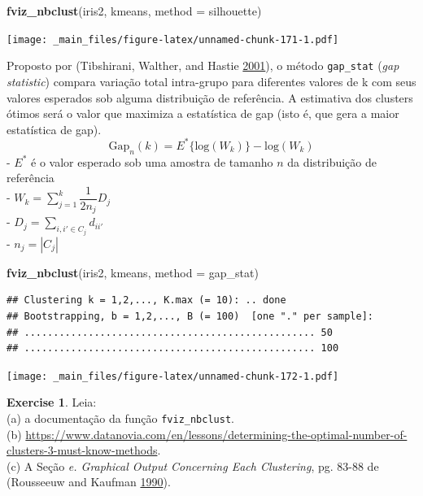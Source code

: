 \documentclass[
]{book}
\newenvironment{Shaded}{\begin{snugshade}}{\end{snugshade}}
\newcommand{\DataTypeTok}[1]{\textcolor[rgb]{0.13,0.29,0.53}{#1}}
\newcommand{\KeywordTok}[1]{\textcolor[rgb]{0.13,0.29,0.53}{\textbf{#1}}}
\newcommand{\NormalTok}[1]{#1}
\newcommand{\StringTok}[1]{\textcolor[rgb]{0.31,0.60,0.02}{#1}}
\theoremstyle{definition}
\theoremstyle{definition}
\theoremstyle{definition}
\newtheorem{exercise}{Exercise}[chapter]
\theoremstyle{remark}
\begin{document}
\begin{Shaded}
\begin{Highlighting}[]
\KeywordTok{fviz\_nbclust}\NormalTok{(iris2, kmeans, }\DataTypeTok{method =} \StringTok{\textquotesingle{}silhouette\textquotesingle{}}\NormalTok{)}
\end{Highlighting}
\end{Shaded}

\texttt{[image: \_main\_files/figure-latex/unnamed-chunk-171-1.pdf]}

Proposto por (Tibshirani, Walther, and Hastie \protect\hyperlink{ref-tibshirani2001estimating}{2001}), o método \texttt{gap\_stat} (\emph{gap statistic}) compara variação total intra-grupo para diferentes valores de k com seus valores esperados sob alguma distribuição de referência. A estimativa dos clusters ótimos será o valor que maximiza a estatística de gap (isto é, que gera a maior estatística de gap).
\begin{equation}
\mathrm{Gap}_{n}(k) = E^{*} \{ \mathrm{log}(W_k) \} - \mathrm{log}(W_k)
\label{eq:gap}
\end{equation}
- \(E^{*}\) é o valor esperado sob uma amostra de tamanho \(n\) da distribuição de referência\\
- \(W_k = \sum_{j=1}^{k} \dfrac{1}{2n_j} D_j\)\\
- \(D_j = \sum_{i,i' \in C_j} d_{ii'}\)\\
- \(n_j = |C_j|\)

\begin{Shaded}
\begin{Highlighting}[]
\KeywordTok{fviz\_nbclust}\NormalTok{(iris2, kmeans, }\DataTypeTok{method =} \StringTok{\textquotesingle{}gap\_stat\textquotesingle{}}\NormalTok{)}
\end{Highlighting}
\end{Shaded}

\begin{verbatim}
## Clustering k = 1,2,..., K.max (= 10): .. done
## Bootstrapping, b = 1,2,..., B (= 100)  [one "." per sample]:
## .................................................. 50 
## .................................................. 100
\end{verbatim}

\texttt{[image: \_main\_files/figure-latex/unnamed-chunk-172-1.pdf]}

\begin{exercise}
\protect\hypertarget{exr:unnamed-chunk-173}{}{\label{exr:unnamed-chunk-173} }Leia:\\
(a) a documentação da função \texttt{fviz\_nbclust}.\\
(b) \url{https://www.datanovia.com/en/lessons/determining-the-optimal-number-of-clusters-3-must-know-methods}.\\
(c) A Seção \emph{e. Graphical Output Concerning Each Clustering}, pg. 83-88 de (Rousseeuw and Kaufman \protect\hyperlink{ref-rousseeuw1990finding}{1990}).
\end{exercise}
\end{document}
